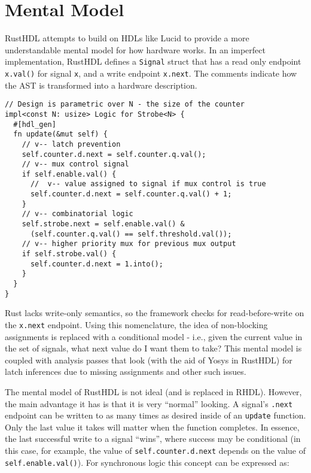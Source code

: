 \documentclass[sigplan,screen,sigconf]{acmart}
\begin{document}
\section{Mental Model}
RustHDL attempts to build on HDLs like Lucid\cite{b11} to provide a more 
understandable mental model for how hardware works.  In an imperfect 
implementation, RustHDL defines a \verb|Signal| struct that has a read only 
endpoint \verb|x.val()| for signal \verb|x|, and a write endpoint \verb|x.next|.    
The comments indicate how the AST is transformed into a hardware description. 

\begin{verbatim}
// Design is parametric over N - the size of the counter
impl<const N: usize> Logic for Strobe<N> {
  #[hdl_gen]
  fn update(&mut self) {
    // v-- latch prevention
    self.counter.d.next = self.counter.q.val();
    // v-- mux control signal
    if self.enable.val() {
      //  v-- value assigned to signal if mux control is true
      self.counter.d.next = self.counter.q.val() + 1;
    }
    // v-- combinatorial logic
    self.strobe.next = self.enable.val() & 
      (self.counter.q.val() == self.threshold.val());
    // v-- higher priority mux for previous mux output
    if self.strobe.val() {
      self.counter.d.next = 1.into();
    }
  }
} 
\end{verbatim}

Rust lacks write-only semantics, so the framework checks for read-before-write on the 
\verb|x.next| endpoint.  Using this nomenclature, the idea of non-blocking assignments 
is replaced with a conditional model - i.e., given the current value in the set of 
signals, what next value do I want them to take?  This mental model is coupled with 
analysis passes that look (with the aid of Yosys\cite{b12} in RustHDL) for latch 
inferences due to missing assignments and other such issues.

The mental model of RustHDL is not ideal (and is replaced in RHDL).  However, the main 
advantage it has is that it is very ``normal'' looking.  A signal's \verb|.next| endpoint 
can be written to as many times as desired inside of an \verb|update| function.  Only 
the last value it takes will matter when the function completes.  In essence, the last 
successful write to a signal ``wins'', where success may be conditional (in this case, 
for example, the value of \verb|self.counter.d.next| depends on the value of 
\verb|self.enable.val()|).  For synchronous logic this concept can be expressed as:
\end{document}
